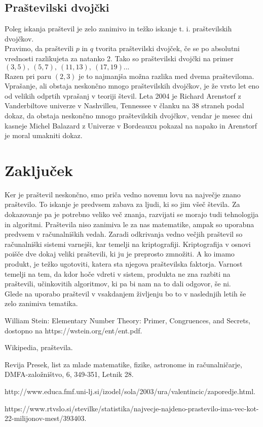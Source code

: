 \documentclass[a4paper,12pt]{article}
\begin{document}
\subsection{Praštevilski dvojčki}
Poleg iskanja praštevil je zelo zanimivo in težko iskanje t. i. praštevilskih dvojčkov.
\\
Pravimo, da praštevili $p$ in $q$ tvorita praštevilski dvojček, če se po absolutni
vrednosti razlikujeta za natanko 2. Tako so praštevilski dvojčki na primer $(3,5),
\ (5,7), \ (11,13), \ (17,19)...$
\\
Razen pri paru $(2,3)$ je to najmanjša možna razlika
med dvema prašteviloma.
Vprašanje, ali obstaja neskončno mnogo praštevilskih dvojčkov, je že vrsto let
eno od velikih odprtih vprašanj v teoriji števil. Leta 2004 je Richard Arenstorf
z Vanderbiltove univerze v Nashvilleu, Tennessee v članku na 38 straneh podal
dokaz, da obstaja neskončno mnogo praštevilskih dvojčkov, vendar je mesec
dni kasneje Michel Balazard z Univerze v Bordeauxu pokazal na napako in
Arenstorf je moral umakniti dokaz.

\newpage
\section{Zaključek}
Ker je praštevil neskončno, smo priča vedno novemu lovu na največje znano praštevilo. To iskanje je predvsem zabava za ljudi, ki so jim všeč števila. Za dokazovanje pa je potrebno veliko več znanja, razvijati se morajo tudi tehnologija in algoritmi. Praštevila niso zanimiva le za nas matematike, ampak so uporabna predvsem v računalniških vedah. Zaradi odkrivanja vedno večjih praštevil so računalniški sistemi varnejši, kar temelji na kriptografiji. Kriptografija v osnovi poišče dve dokaj veliki praštevili, ki ju je preprosto zmnožiti. A ko imamo produkt, je težko ugotoviti, katera sta njegova praštevilska faktorja. Varnost temelji na tem, da kdor hoče vdreti v sistem, produkta ne zna razbiti na praštevili, učinkovitih algoritmov, ki pa bi nam na to dali odgovor, še ni.	
\\
Glede na uporabo praštevil v vsakdanjem življenju bo to v naslednjih letih še zelo zanimiva tematika.

\newpage	
\begin{thebibliography}{99}
	William Stein: Elementary Number Theory: Primer, Congruences, and
	Secrets, dostopno na https://wstein.org/ent/ent.pdf.
	
	 Wikipedia, praštevila.
	
	 Revija Presek, list za mlade matematike, fizike, astronome in računalničarje,
	DMFA-založništvo, 6, 349-351, Letnik 28.
	
	 http://www.educa.fmf.uni-lj.si/izodel/sola/2003/ura/valentincic/zaporedje.html.
	
	 https://www.rtvslo.si/stevilke/statistika/najvecje-najdeno-prastevilo-ima-vec-kot-22-milijonov-mest/393403.
	
	
\end{thebibliography}
\end{document}
